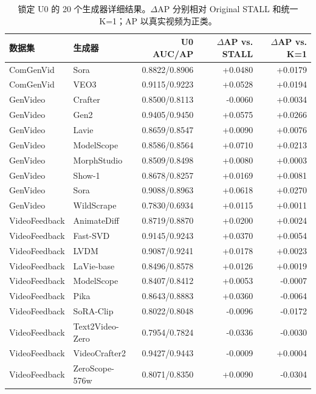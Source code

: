\begin{table}[!t]
  \centering
  \caption{锁定 U0 的 20 个生成器详细结果。$\Delta$AP 分别相对 Original STALL 和统一 K=1；AP 以真实视频为正类。}
  \label{tab:u0_generator_results}
  \begin{tabular}{llrrr}
    \toprule
    数据集 & 生成器 & U0 AUC/AP & $\Delta$AP vs. STALL & $\Delta$AP vs. K=1 \\
    \midrule
    ComGenVid & Sora & 0.8822/0.8906 & +0.0480 & +0.0179 \\
    ComGenVid & VEO3 & 0.9115/0.9223 & +0.0528 & +0.0194 \\
    \midrule
    GenVideo & Crafter & 0.8500/0.8113 & -0.0060 & +0.0034 \\
    GenVideo & Gen2 & 0.9405/0.9450 & +0.0575 & +0.0266 \\
    GenVideo & Lavie & 0.8659/0.8547 & +0.0090 & +0.0076 \\
    GenVideo & ModelScope & 0.8586/0.8564 & +0.0710 & +0.0213 \\
    GenVideo & MorphStudio & 0.8509/0.8498 & +0.0080 & +0.0003 \\
    GenVideo & Show-1 & 0.8678/0.8257 & +0.0169 & +0.0081 \\
    GenVideo & Sora & 0.9088/0.8963 & +0.0618 & +0.0270 \\
    GenVideo & WildScrape & 0.7830/0.6934 & +0.0115 & +0.0011 \\
    \midrule
    VideoFeedback & AnimateDiff & 0.8719/0.8870 & +0.0200 & +0.0024 \\
    VideoFeedback & Fast-SVD & 0.9145/0.9243 & +0.0370 & +0.0054 \\
    VideoFeedback & LVDM & 0.9087/0.9241 & +0.0178 & +0.0023 \\
    VideoFeedback & LaVie-base & 0.8496/0.8578 & +0.0126 & +0.0019 \\
    VideoFeedback & ModelScope & 0.8407/0.8412 & +0.0053 & -0.0007 \\
    VideoFeedback & Pika & 0.8643/0.8883 & +0.0360 & -0.0064 \\
    VideoFeedback & SoRA-Clip & 0.8022/0.8048 & -0.0096 & -0.0172 \\
    VideoFeedback & Text2Video-Zero & 0.7954/0.7824 & -0.0336 & -0.0030 \\
    VideoFeedback & VideoCrafter2 & 0.9427/0.9443 & -0.0009 & +0.0004 \\
    VideoFeedback & ZeroScope-576w & 0.8071/0.8350 & +0.0090 & -0.0304 \\
    \bottomrule
  \end{tabular}
\end{table}
